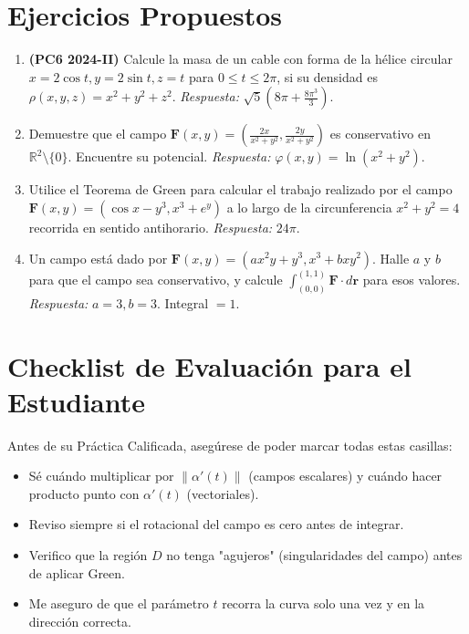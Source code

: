 \documentclass[11pt,a4paper]{article}
\begin{document}
\section{Ejercicios Propuestos}

\begin{enumerate}
    \item \textbf{(PC6 2024-II)} Calcule la masa de un cable con forma de la hélice circular $x=2\cos t, y=2\sin t, z=t$ para $0 \le t \le 2\pi$, si su densidad es $\rho(x,y,z) = x^2 + y^2 + z^2$. \newline \textit{Respuesta:} $\sqrt{5}(8\pi + \frac{8\pi^3}{3})$.
    \item Demuestre que el campo $\mathbf{F}(x,y) = (\frac{2x}{x^2+y^2}, \frac{2y}{x^2+y^2})$ es conservativo en $\mathbb{R}^2 \setminus \{0\}$. Encuentre su potencial. \newline \textit{Respuesta:} $\varphi(x,y) = \ln(x^2+y^2)$.
    \item Utilice el Teorema de Green para calcular el trabajo realizado por el campo $\mathbf{F}(x,y) = (\cos x - y^3, x^3 + e^y)$ a lo largo de la circunferencia $x^2+y^2=4$ recorrida en sentido antihorario. \newline \textit{Respuesta:} $24\pi$.
    \item Un campo está dado por $\mathbf{F}(x,y) = (ax^2y + y^3, x^3 + bxy^2)$. Halle $a$ y $b$ para que el campo sea conservativo, y calcule $\int_{(0,0)}^{(1,1)} \mathbf{F} \cdot d\mathbf{r}$ para esos valores. \newline \textit{Respuesta:} $a=3, b=3$. Integral $= 1$.
\end{enumerate}

\section{Checklist de Evaluación para el Estudiante}
Antes de su Práctica Calificada, asegúrese de poder marcar todas estas casillas:
\begin{itemize}[label=$\square$]
    \item Sé cuándo multiplicar por $\|\alpha'(t)\|$ (campos escalares) y cuándo hacer producto punto con $\alpha'(t)$ (vectoriales).
    \item Reviso siempre si el rotacional del campo es cero antes de integrar.
    \item Verifico que la región $D$ no tenga "agujeros" (singularidades del campo) antes de aplicar Green.
    \item Me aseguro de que el parámetro $t$ recorra la curva solo una vez y en la dirección correcta.
\end{itemize}
\end{document}
